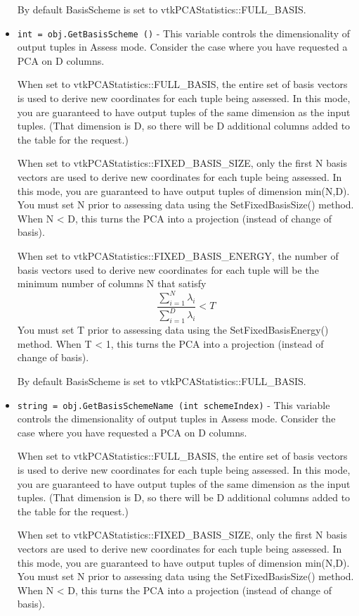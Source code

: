 \begin{itemize}
 By default BasisScheme is set to vtkPCAStatistics::FULL\_BASIS.

\item  \verb|int = obj.GetBasisScheme ()| -  This variable controls the dimensionality of output tuples in Assess mode.
 Consider the case where you have requested a PCA on D columns.

 When set to vtkPCAStatistics::FULL\_BASIS, the entire set of basis vectors
 is used to derive new coordinates for each tuple being assessed.
 In this mode, you are guaranteed to have output tuples of the same dimension
 as the input tuples. (That dimension is D, so there will be D additional
 columns added to the table for the request.)

 When set to vtkPCAStatistics::FIXED\_BASIS\_SIZE, only the first N basis vectors
 are used to derive new coordinates for each tuple being assessed.
 In this mode, you are guaranteed to have output tuples of dimension min(N,D).
 You must set N prior to assessing data using the SetFixedBasisSize() method.
 When N < D, this turns the PCA into a projection (instead of change of basis).

 When set to vtkPCAStatistics::FIXED\_BASIS\_ENERGY, the number of basis vectors
 used to derive new coordinates for each tuple will be the minimum number
 of columns N that satisfy
 \[
   \frac{\sum_{i=1}^{N} \lambda_i}{\sum_{i=1}^{D} \lambda_i} < T
 \]
 You must set T prior to assessing data using the SetFixedBasisEnergy() method.
 When T < 1, this turns the PCA into a projection (instead of change of basis).

 By default BasisScheme is set to vtkPCAStatistics::FULL\_BASIS.

\item  \verb|string = obj.GetBasisSchemeName (int schemeIndex)| -  This variable controls the dimensionality of output tuples in Assess mode.
 Consider the case where you have requested a PCA on D columns.

 When set to vtkPCAStatistics::FULL\_BASIS, the entire set of basis vectors
 is used to derive new coordinates for each tuple being assessed.
 In this mode, you are guaranteed to have output tuples of the same dimension
 as the input tuples. (That dimension is D, so there will be D additional
 columns added to the table for the request.)

 When set to vtkPCAStatistics::FIXED\_BASIS\_SIZE, only the first N basis vectors
 are used to derive new coordinates for each tuple being assessed.
 In this mode, you are guaranteed to have output tuples of dimension min(N,D).
 You must set N prior to assessing data using the SetFixedBasisSize() method.
 When N < D, this turns the PCA into a projection (instead of change of basis).


\end{itemize}
